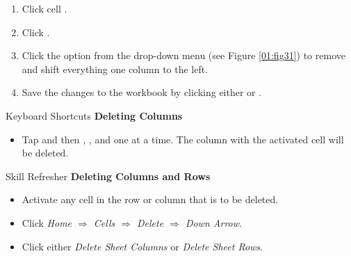 \begin{enumbox}
	\begin{enumerate}
		\item Click cell .
		\item Click .
		\item Click the  option from the drop-down menu (see Figure \ref{01:fig31}) to remove  and shift everything one column to the left.
		\item Save the changes to the workbook by clicking either  or .
	\end{enumerate}
\end{enumbox}

\begin{center}
	\begin{shtcutbox}{Keyboard Shortcuts}
		\textbf{Deleting Columns}
		\\
		\begin{itemize}
			\setlength{\itemsep}{0pt}
			\setlength{\parskip}{0pt}
			\setlength{\parsep}{0pt}
			
			\item Tap  and then , , and  one at a time. The column with the activated cell will be deleted.
			
		\end{itemize}
	\end{shtcutbox}
\end{center}

\begin{center}
	\begin{sklbox}{Skill Refresher}
		\textbf{Deleting Columns and Rows}
		\\
		\begin{itemize}
			\setlength{\itemsep}{0pt}
			\setlength{\parskip}{0pt}
			\setlength{\parsep}{0pt}
			
			\item Activate any cell in the row or column that is to be deleted.
			\item Click \textit{Home $ \Rightarrow $ Cells $ \Rightarrow $ Delete $ \Rightarrow $ Down Arrow}.
			\item Click either \textit{Delete Sheet Columns} or \textit{Delete Sheet Rows}.
			
		\end{itemize}
	\end{sklbox}
\end{center}

